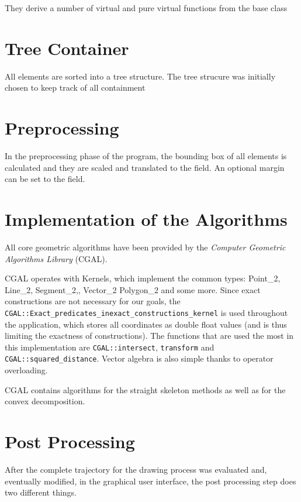 They derive a number of virtual and pure virtual functions from the base class

	\section{Tree Container}

All elements are sorted into a tree structure. The tree strucure was initially chosen to keep track of all containment 

\section{Preprocessing}

In the preprocessing phase of the program, the bounding box of all elements is calculated and they are scaled and translated to the field. An optional margin can be set to the field.

\section{Implementation of the Algorithms}

All core geometric algorithms have been provided by the \textit{Computer Geometric Algorithms Library}\cite{cgal:eb-00a} (CGAL).

CGAL operates with Kernels, which implement the common types: Point\_2, Line\_2, Segment\_2,, Vector\_2 Polygon\_2 and some more. Since exact constructions are not necessary for our goals, the \texttt{CGAL::Exact\_predicates\_inexact\_constructions\_kernel} is used throughout the application, which stores all coordinates as double float values (and is thus limiting the exactness of constructions). The functions that are used the most in this implementation are \texttt{CGAL::intersect}, \texttt{transform} and \texttt{CGAL::squared\_distance}. Vector algebra is also simple thanks to operator overloading.

CGAL contains algorithms for the straight skeleton methods\cite{cgal:c-sspo2-14a} as well as for the convex decomposition\cite{cgal:h-pp2-00a}.

\section{Post Processing}

After the complete trajectory for the drawing process was evaluated and, eventually modified, in the graphical user interface, the post processing step does two different things.

